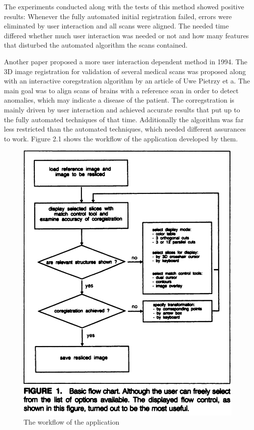 \documentclass[hyperref,english,bachelorofscience,bibnum,twoside]{cgvpub}
\begin{document}
The experiments conducted along with the tests of this method showed positive results:
Whenever the fully automated initial registration failed, errors were eliminated by user interaction and all scans were aligned. The needed time differed whether much user interaction was needed or not and how many features that disturbed the automated algorithm the scans contained.

Another paper proposed a more user interaction dependent method in 1994.
The 3D image registration for validation of several medical scans was proposed along with an interactive coregstration algorithm by an article of Uwe Pietrzy et a\cite{Pietrzyk1994}. The main goal was to align scans of brains with a reference scan in order to detect anomalies, which may indicate a disease of the patient. The corregstration is mainly driven by user interaction and achieved accurate results that put up to the fully automated techniques of that time. Additionally the algorithm was far less restricted than the automated techniques, which needed different assurances to work. Figure 2.1 shows the workflow of the application developed by them.
\begin{figure}[htbp]
	\centering
		\includegraphics[width= \linewidth]{flow_chart_uwe_p.png}
	\caption{The workflow of the application\cite{Pietrzyk1994}}
	\label{fig:workflow}
\end{figure}
\end{document}
